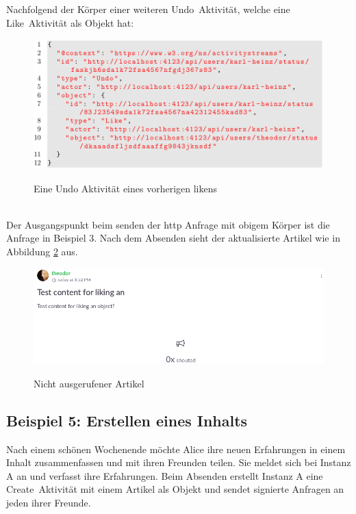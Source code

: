 Nachfolgend der Körper einer weiteren \glqq Undo\grqq~Aktivität, welche eine \glqq Like\grqq~Aktivität als Objekt hat:
\begin{figure}[h]
	\centering
	\includegraphics[scale=0.45]{figures/undo-like-activity.png}
	\label{fig:undo-like-activity}
	\caption{Eine Undo Aktivität eines vorherigen likens}
\end{figure}\\
Der Ausgangspunkt beim senden der \gls{http} Anfrage mit obigem Körper ist die Anfrage in Beispiel 3. Nach dem Absenden sieht der aktualisierte Artikel wie in Abbildung \ref{fig:undo-like-activity-result} aus.
\begin{figure}[h]
	\centering
	\includegraphics[scale=0.45]{figures/undo-like-activity-result.png}
	\label{fig:undo-like-activity-result}
	\caption{Nicht ausgerufener Artikel}
\end{figure}
\pagebreak
\subsection{
	\textbf{Beispiel 5}: Erstellen eines Inhalts
}
\label{subsec:example-5}
Nach einem schönen Wochenende möchte Alice ihre neuen Erfahrungen in einem Inhalt zusammenfassen und mit ihren Freunden teilen. Sie meldet sich bei Instanz A an und verfasst ihre Erfahrungen. Beim Absenden erstellt Instanz A eine \glqq Create\grqq~Aktivität mit einem Artikel als Objekt und sendet signierte Anfragen an jeden ihrer Freunde.\\

